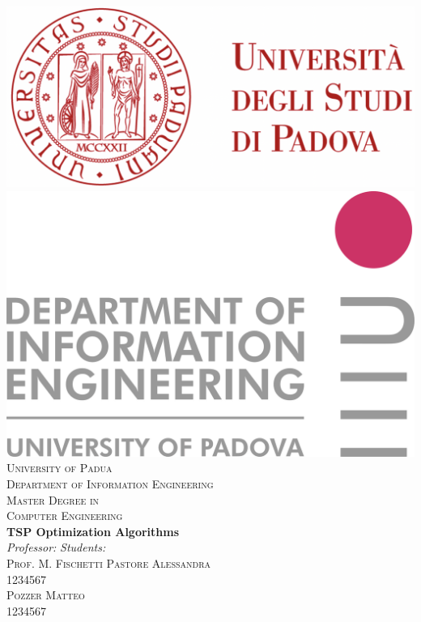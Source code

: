 



\renewcommand{\contentsname}{Index}
\renewcommand{\chaptername}{Chapter}
\renewcommand{\bibname}{References}
\renewcommand{\figurename}{Figure}

\begin{titlepage}
\begin{center}

\includegraphics[scale=0.2]{images/logo_unipd.png} \hfill \includegraphics[scale=0.1]{images/logo_dei.png}\\
\vspace{0.8cm}
\textsc{\LARGE University of Padua}\\
\vspace{0.45cm}
\textsc{\large Department of Information Engineering}\\
\vspace{0.4cm}
\textsc{\large Master Degree in}\\
\textsc{\large Computer Engineering}\\
\vfill
{ \LARGE \bfseries TSP Optimization Algorithms
}\\
\vfill
\textit{\large Professor:} \hfill \textit{\large Students:}\\
\textsc{\large Prof. M. Fischetti} \hfill \textsc{Pastore Alessandra}\\
\hfill \textsc{1234567}\\
\hfill \textsc{Pozzer Matteo}\\
\hfill \textsc{1234567}\\


\end{center}
\end{titlepage}
